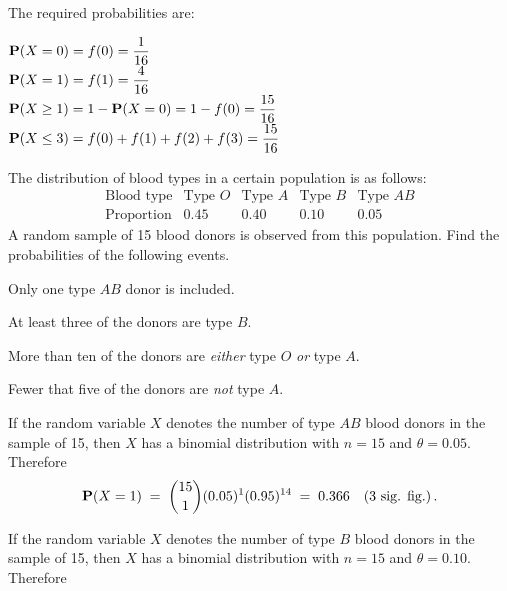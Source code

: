 \begin{ExerciseList}
\item The required probabilities are:

$\displaystyle \mathbf{P}(X=0)=f(0)=\frac{1}{16}$\\[3pt]
$\displaystyle \mathbf{P}(X=1)=f(1)=\frac{4}{16}$\\[3pt]
$\displaystyle \mathbf{P}(X\geq1)=1-\mathbf{P}(X=0)=1-f(0)=\frac{15}{16}$\\[3pt]
$\displaystyle \mathbf{P}(X\leq3)=f(0)+f(1)+f(2)+f(3)=\frac{15}{16}$
\ee

\Exercise
The distribution of blood types in a certain  population is as follows:
$$
\begin{array}{c|cccc}
\text{Blood type}&\text{Type } O&\text{Type } A&\text{Type } B& \text{Type }AB\\\hline
\text{Proportion}&0.45&0.40&0.10&0.05
\end{array}
$$
A random sample of 15 blood donors is observed from this
population. Find the probabilities of the following events.

\be
\item Only one type $AB$ donor is included.
\item At least three of the donors are type $B$.
\item More than ten of the donors are \emph{either} type $O$ \emph{or} type $A$.
\item Fewer that five of the donors are \emph{not} type $A$.
\ee
\Answer
\be
\item  If the random variable $X$ denotes the number of type $AB$ blood donors
  in the sample of 15, then $X$ has a binomial distribution with $n=15$
  and $\theta=0.05$.  Therefore
\[\mathbf{P}(X=1) \;=\;\binom{15}{1} (0.05)^1  (0.95)^{14}\;=\;0.366 \quad (\text{3 sig. fig.}) \,.\]

\medskip
\item  If the random variable $X$ denotes the number of type $B$  blood donors
  in the sample of 15, then $X$ has a binomial distribution with $n=15$
  and $\theta=0.10$.  Therefore


\end{ExerciseList}

